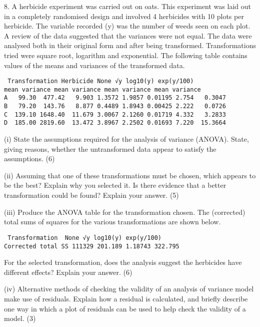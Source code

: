 \documentclass[a4paper,12pt]{article}
\begin{document}
\begin{framed}

8. A herbicide experiment was carried out on oats.  This experiment was laid out in a completely randomised design and involved 4 
herbicides with 10 plots per herbicide.  The variable recorded (y) was the number of weeds seen on each plot.  
A review of the data suggested that the variances were not equal.  The data were analysed both in their original form and after being transformed.  
Transformations tried were square root, logarithm and exponential.  The following table contains values of the means and variances of the transformed data. 
 
\begin{verbatim} 
 Transformation Herbicide None √y log10(y) exp(y/100)  
mean variance mean variance mean variance mean variance 
A   99.30  477.42   9.903 1.3572 1.9857 0.01195 2.754   0.3047 
B   79.20  143.76   8.877 0.4489 1.8943 0.00425 2.222   0.0726 
C  139.10 1648.40  11.679 3.0067 2.1260 0.01719 4.332   3.2833 
D  185.00 2819.60  13.472 3.8967 2.2502 0.01693 7.220  15.3664 
\end{verbatim} 
 
(i) State the assumptions required for the analysis of variance (ANOVA).  
State, giving reasons, whether the untransformed data appear to satisfy the assumptions. (6) 
 
(ii) Assuming that one of these transformations must be chosen, which appears to be the best?  Explain why you selected it.  Is there evidence that a better transformation could be found?  Explain your answer. (5) 
 
(iii) Produce the ANOVA table for the transformation chosen. The (corrected) total sums of squares for the various transformations are shown below. 
\begin{verbatim}  
 Transformation  None √y log10(y) exp(y/100) 
Corrected total SS 111329 201.189 1.18743 322.795 
\end{verbatim} 
  
For the selected transformation, does the analysis suggest the herbicides have different effects?  Explain your answer. (6) 
 
(iv) Alternative methods of checking the validity of an analysis of variance model make use of residuals.  Explain how a residual is calculated, and briefly describe one way in which a plot of residuals can be used to help check the validity of a model. (3) 
 
\end{framed}
\end{document}
